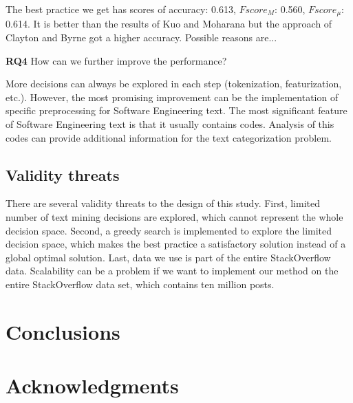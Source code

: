 \documentclass{sig-alternate-05-2015}
\begin{document}
The best practice we get has scores of accuracy: 0.613, $Fscore_{M}$: 0.560, $Fscore_{\mu}$: 0.614. It is better than the results of Kuo \cite{kuo2011word} and Moharana \cite{moharanatag} but the approach of Clayton and Byrne \cite{stanley2013predicting} got a higher accuracy. Possible reasons are...

\textbf{RQ4} How can we further improve the performance?

More decisions can always be explored in each step (tokenization, featurization, etc.). However, the most promising improvement can be the implementation of specific preprocessing for Software Engineering text. The most significant feature of Software Engineering text is that it usually contains codes. Analysis of this codes can provide additional information for the text categorization problem.

\subsection{Validity threats}

There are several validity threats to the design of this study. First, limited number of text mining decisions are explored, which cannot represent the whole decision space. Second, a greedy search is implemented to explore the limited decision space, which makes the best practice a satisfactory solution instead of a global optimal solution. Last, data we use is part of the entire StackOverflow data. Scalability can be a problem if we want to implement our method on the entire StackOverflow data set, which contains ten million posts.

\section{Conclusions}
\label{sec:Conclusions}



\section{Acknowledgments}


%

%
%
\end{document}

